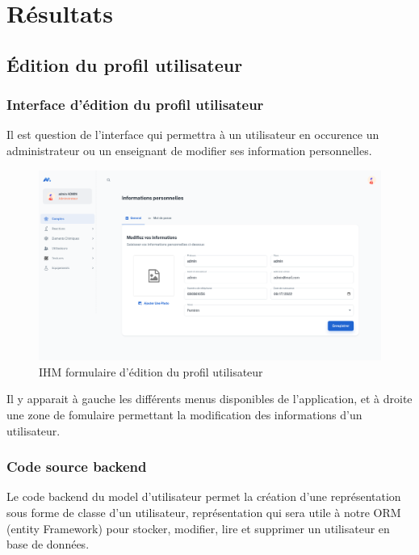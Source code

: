 \newpage
\section{Résultats}

\subsection{Édition du profil utilisateur}

\subsubsection{Interface d'édition du profil utilisateur}

Il est question de l'interface qui permettra à un utilisateur en occurence un administrateur ou un enseignant de modifier ses information personnelles.

\begin{figure}[H]
	\centering
	\includegraphics[width=1\textwidth]{img/editpr}
	\caption{IHM formulaire d'édition du profil utilisateur}
	\label{fig:mesh1}
\end{figure}

Il y apparait à gauche les différents menus disponibles de l'application, et à droite une zone de fomulaire permettant la modification des informations d'un utilisateur.

\subsubsection{Code source backend}

Le code backend du model d'utilisateur permet la création d'une représentation sous forme de classe d'un utilisateur, représentation qui sera utile à notre ORM (entity Framework) pour stocker, modifier, lire et supprimer un utilisateur en base de données.

